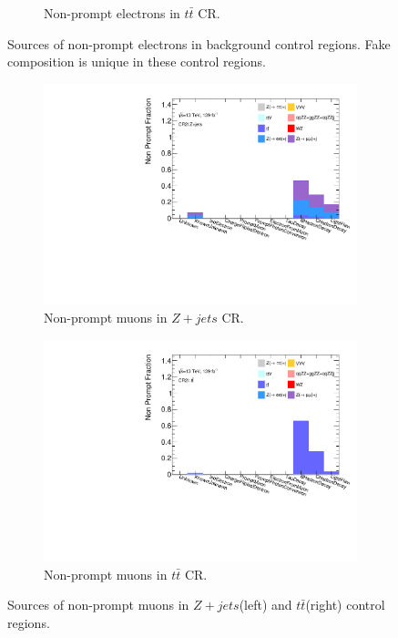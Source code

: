 \begin{figure}[!htb]
\begin{subfigure}{.48\textwidth}
      \caption{Non-prompt electrons in $t\bar{t}$ CR.}
    \end{subfigure}
    \caption{Sources of non-prompt electrons in background control regions. Fake composition is unique in these control regions.\label{fig:FakeCompositionCR2LElectron}}
    \end{figure}

\begin{figure}[!htb]
    \begin{subfigure}{.48\textwidth}
        \centering
        \includegraphics[width=.9\linewidth]{figures/Analysis/Background/NonPromptComposition_ZplusX_Muon.pdf}
        \caption{Non-prompt muons in $Z+jets$ CR.}
    \end{subfigure}
    \begin{subfigure}{.48\textwidth}
        \centering
        \includegraphics[width=.9\linewidth]{figures/Analysis/Background/NonPromptComposition_ttbar_Muons.pdf}
        \caption{Non-prompt muons in $t\bar{t}$ CR.}
    \end{subfigure}
        \caption{ Sources of non-prompt muons in $Z+jets$(left) and $t\bar{t}$(right) control regions.\label{fig:FakeCompositionCR2LMuon}}
\end{figure}

